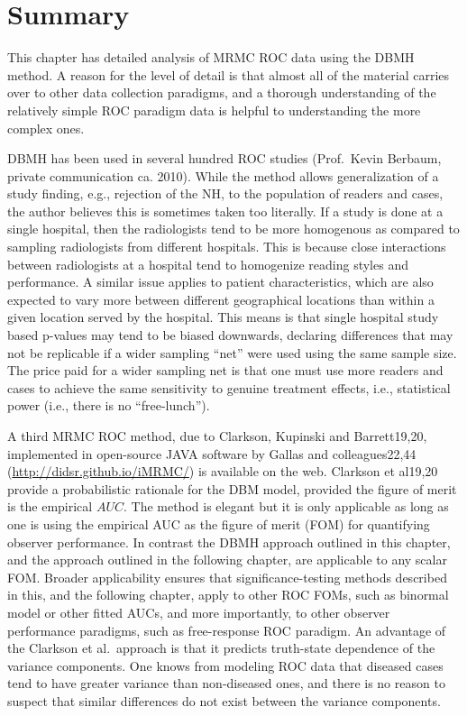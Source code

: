 \documentclass[
]{book}
\begin{document}
\hypertarget{summary}{%
\section{Summary}\label{summary}}

This chapter has detailed analysis of MRMC ROC data using the DBMH method. A reason for the level of detail is that almost all of the material carries over to other data collection paradigms, and a thorough understanding of the relatively simple ROC paradigm data is helpful to understanding the more complex ones.

DBMH has been used in several hundred ROC studies (Prof.~Kevin Berbaum, private communication ca. 2010). While the method allows generalization of a study finding, e.g., rejection of the NH, to the population of readers and cases, the author believes this is sometimes taken too literally. If a study is done at a single hospital, then the radiologists tend to be more homogenous as compared to sampling radiologists from different hospitals. This is because close interactions between radiologists at a hospital tend to homogenize reading styles and performance. A similar issue applies to patient characteristics, which are also expected to vary more between different geographical locations than within a given location served by the hospital. This means is that single hospital study based p-values may tend to be biased downwards, declaring differences that may not be replicable if a wider sampling ``net'' were used using the same sample size. The price paid for a wider sampling net is that one must use more readers and cases to achieve the same sensitivity to genuine treatment effects, i.e., statistical power (i.e., there is no ``free-lunch'').

A third MRMC ROC method, due to Clarkson, Kupinski and Barrett19,20, implemented in open-source JAVA software by Gallas and colleagues22,44 (\url{http://didsr.github.io/iMRMC/}) is available on the web. Clarkson et al19,20 provide a probabilistic rationale for the DBM model, provided the figure of merit is the empirical \(AUC\). The method is elegant but it is only applicable as long as one is using the empirical AUC as the figure of merit (FOM) for quantifying observer performance. In contrast the DBMH approach outlined in this chapter, and the approach outlined in the following chapter, are applicable to any scalar FOM. Broader applicability ensures that significance-testing methods described in this, and the following chapter, apply to other ROC FOMs, such as binormal model or other fitted AUCs, and more importantly, to other observer performance paradigms, such as free-response ROC paradigm. An advantage of the Clarkson et al.~approach is that it predicts truth-state dependence of the variance components. One knows from modeling ROC data that diseased cases tend to have greater variance than non-diseased ones, and there is no reason to suspect that similar differences do not exist between the variance components.
\end{document}
